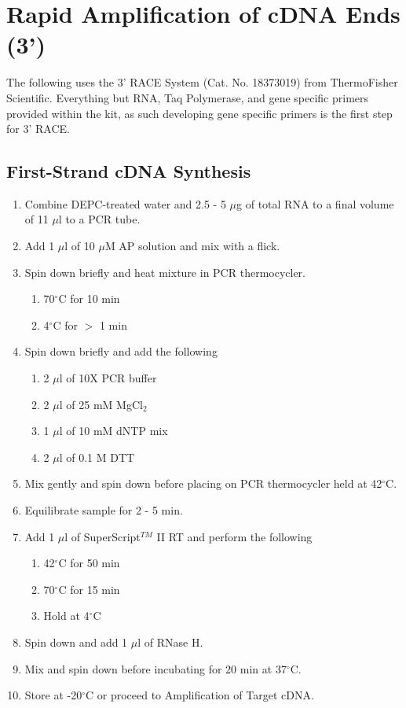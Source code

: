 \section{Rapid Amplification of cDNA Ends (3')}

\noindent The following uses the 3' RACE System (Cat. No. 18373019) from ThermoFisher Scientific. Everything but RNA, Taq Polymerase, and gene specific primers provided within the kit, as such developing gene specific primers is the first step for 3' RACE.

\subsection{First-Strand cDNA Synthesis}
\begin{enumerate}
\item Combine DEPC-treated water and 2.5 - 5 $\mu$g of total RNA to a final volume of 11 $\mu$l to a PCR tube.
\item Add 1 $\mu$l of 10 $\mu$M AP solution and mix with a flick.
\item Spin down briefly and heat mixture in PCR thermocycler.
  \begin{enumerate}
  \item 70$^{\circ}$C for 10 min
  \item 4$^{\circ}$C for $>$ 1 min
  \end{enumerate}
\item Spin down briefly and add the following
  \begin{enumerate}
  \item 2 $\mu$l of 10X PCR buffer
  \item 2 $\mu$l of 25 mM MgCl$_2$
  \item 1 $\mu$l of 10 mM dNTP mix
  \item 2 $\mu$l of 0.1 M DTT
  \end{enumerate}
\item Mix gently and spin down before placing on PCR thermocycler held at 42$^{\circ}$C.
\item Equilibrate sample for 2 - 5 min.
\item Add 1 $\mu$l of SuperScript$^{TM}$ II RT and perform the following
  \begin{enumerate}
  \item 42$^{\circ}$C for 50 min
  \item 70$^{\circ}$C for 15 min
  \item Hold at 4$^{\circ}$C
  \end{enumerate}
\item Spin down and add 1 $\mu$l of RNase H.
\item Mix and spin down before incubating for 20 min at 37$^{\circ}$C.
\item Store at -20$^{\circ}$C or proceed to Amplification of Target cDNA.
\end{enumerate}

